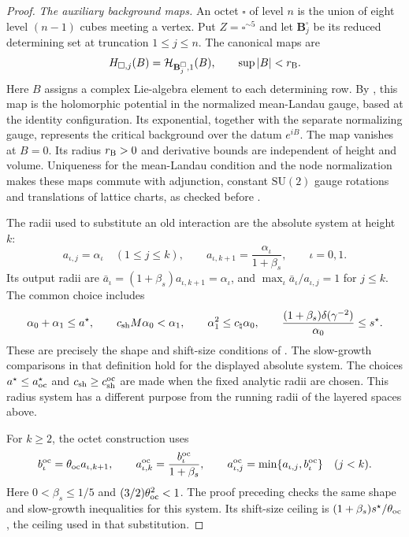 \documentclass[11pt,letterpaper,reqno]{amsart}
\theoremstyle{definition}
\theoremstyle{remark}
\begin{document}
\begin{proof}
\emph{The auxiliary background maps.}
An octet $\square$ of level $n$ is the union of eight level
$(n-1)$ cubes meeting a vertex. Put $Z=\square^{\sim5}$ and
let $\mathbf B_j^\square$ be its reduced determining set at
truncation $1\le j\le n$. The canonical maps are
\[
 H_{\square,j}(B)=\mathcal H_{\mathbf B_j^\square,1}(B),
 \qquad \sup|B|<r_{\rm B}.
\]
Here $B$ assigns a complex Lie-algebra element to each
determining row. By \cite[Lem.~4.42]{YMM1}, this map is
the holomorphic potential in the normalized mean-Landau
gauge, based at the identity configuration. Its exponential,
together with the separate normalizing gauge, represents
the critical background over the datum $e^{iB}$.
The map vanishes at $B=0$. Its radius $r_{\rm B}>0$ and
derivative bounds are independent of height and volume.
Uniqueness for the mean-Landau condition and the node
normalization makes these maps commute with adjunction,
constant $\mathrm{SU}(2)$ gauge rotations and translations of lattice charts,
as checked before \cite[Prop.~4.50]{YMM1}.

The radii used to substitute an old interaction are the
absolute system at height $k$:
\[
 a_{\iota,j}=\alpha_\iota\quad(1\le j\le k),\qquad
 a_{\iota,k+1}=\frac{\alpha_\iota}{1+\beta_s},
 \qquad \iota=0,1.
\]
Its output radii are $\bar a_\iota=
(1+\beta_s)a_{\iota,k+1}=\alpha_\iota$, and
$\max_\iota\bar a_\iota/a_{\iota,j}=1$ for $j\le k$.
The common choice includes
\[
 \alpha_0+\alpha_1\le a^\star,\qquad
 c_{\rm sh}M\alpha_0<\alpha_1,\qquad
 \alpha_1^2\le c_\natural\alpha_0,\qquad
 \frac{(1+\beta_s)\delta(\gamma^{-2})}{\alpha_0}
                                                 \le s^\star.
\]
These are precisely the shape and shift-size conditions
of \cite[Def.~4.48]{YMM1}. The slow-growth comparisons
in that definition hold for the displayed absolute
system. The choices $a^\star\le a^\star_{\rm oc}$ and
$c_{\rm sh}\ge c^{\rm oc}_{\rm sh}$ are made when the
fixed analytic radii are chosen. This radius system has
a different purpose from the running radii of the
layered spaces above.

For $k\ge2$, the octet construction uses
\[
 b_\iota^{\rm oc}=\theta_{\rm oc}a_{\iota,k+1},\qquad
 a_{\iota,k}^{\rm oc}=\frac{b_\iota^{\rm oc}}{1+\beta_s},
 \qquad
 a_{\iota,j}^{\rm oc}=\min\{a_{\iota,j},b_\iota^{\rm oc}\}
 \quad(j<k).
\]
Here $0<\beta_s\le1/5$ and
$(3/2)\theta_{\rm oc}^2<1$. The proof preceding
\cite[Prop.~4.50]{YMM1} checks the same shape and
slow-growth inequalities for this system. Its shift-size
ceiling is $(1+\beta_s)s^\star/\theta_{\rm oc}$, the
ceiling used in that substitution.


\end{proof}
\end{document}
